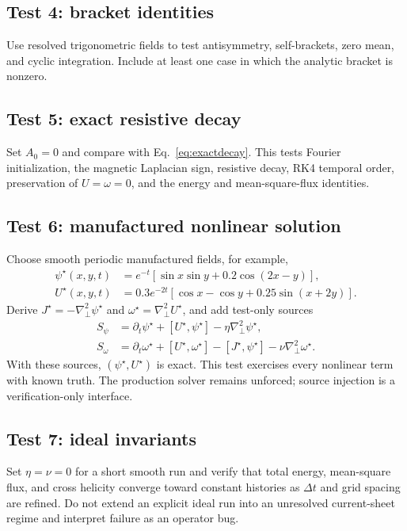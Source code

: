 \documentclass[11pt]{article}
\newcommand{\pd}{\partial}
\newcommand{\bracket}[2]{\left[#1,#2\right]}
\newcommand{\Lap}{\nabla_{\!\perp}^{2}}
\begin{document}
\subsection{Test 4: bracket identities}

Use resolved trigonometric fields to test antisymmetry, self-brackets, zero mean, and cyclic integration. Include at least one case in which the analytic bracket is nonzero.

\subsection{Test 5: exact resistive decay}

Set $A_0=0$ and compare with Eq.~\eqref{eq:exactdecay}. This tests Fourier initialization, the magnetic Laplacian sign, resistive decay, RK4 temporal order, preservation of $U=\omega=0$, and the energy and mean-square-flux identities.

\subsection{Test 6: manufactured nonlinear solution}

Choose smooth periodic manufactured fields, for example,
\begin{align}
\psi^\star(x,y,t)
&=e^{-t}\left[\sin x\sin y
+0.2\cos(2x-y)\right],\\
U^\star(x,y,t)
&=0.3e^{-2t}\left[\cos x-\cos y
+0.25\sin(x+2y)\right].
\end{align}
Derive $J^\star=-\Lap\psi^\star$ and $\omega^\star=\Lap U^\star$, and add test-only sources
\begin{align}
S_\psi
&=\pd_t\psi^\star+\bracket{U^\star}{\psi^\star}
-\eta\Lap\psi^\star,\\
S_\omega
&=\pd_t\omega^\star+\bracket{U^\star}{\omega^\star}
-\bracket{J^\star}{\psi^\star}
-\nu\Lap\omega^\star.
\end{align}
With these sources, $(\psi^\star,U^\star)$ is exact. This test exercises every nonlinear term with known truth. The production solver remains unforced; source injection is a verification-only interface.

\subsection{Test 7: ideal invariants}

Set $\eta=\nu=0$ for a short smooth run and verify that total energy, mean-square flux, and cross helicity converge toward constant histories as $\Delta t$ and grid spacing are refined. Do not extend an explicit ideal run into an unresolved current-sheet regime and interpret failure as an operator bug.
\end{document}
